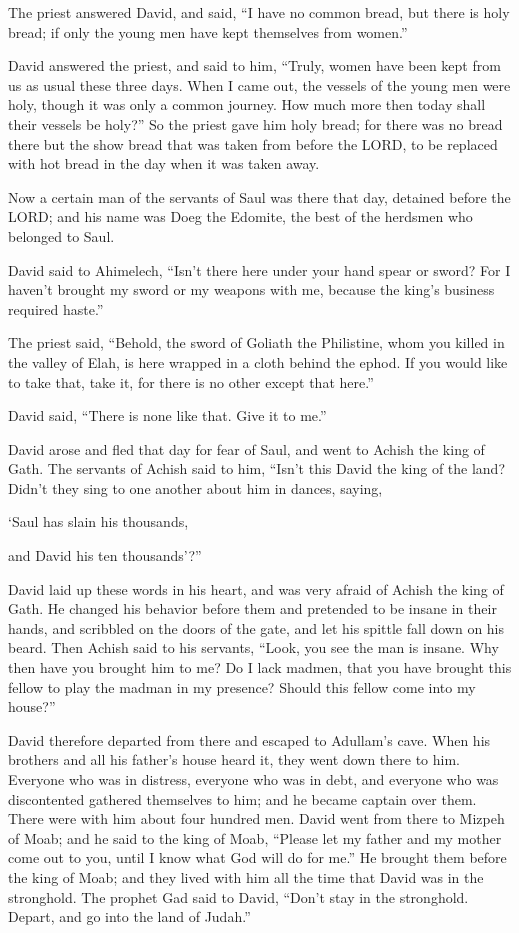 \myverse{}The priest answered David, and said, “I have no common bread,
but there is holy bread; if only the young men have kept themselves from women.”

\myverse{}David answered the priest, and said to him, “Truly, women have
been kept from us as usual these three days. When I came out, the vessels of the young men were holy,
though it was only a common journey. How much more then today shall their vessels be holy?”
\myverse{}So the priest gave him holy bread; for there was no bread there but the show
bread that was taken from before the LORD, to be replaced with hot bread in the day when it was taken
away.

\myverse{}Now a certain man of the servants of Saul was there that day,
detained before the LORD; and his name was Doeg the Edomite, the best of the herdsmen who belonged to
Saul.

\myverse{}David said to Ahimelech, “Isn’t there here under your hand spear
or sword? For I haven’t brought my sword or my weapons with me, because the king’s business required haste.”

\myverse{}The priest said, “Behold, the sword of Goliath the Philistine,
whom you killed in the valley of Elah, is here wrapped in a cloth behind the ephod. If you would like
to take that, take it, for there is no other except that here.”

David said, “There is none like that. Give it to me.”

\myverse{}David arose and fled that day for fear of Saul, and went to
Achish the king of Gath.
\myverse{}The servants of Achish said to him, “Isn’t this David the king of the land?
Didn’t they sing to one another about him in dances, saying,

‘Saul has slain his thousands,

and David his ten thousands’?”

\myverse{}David laid up these words in his heart, and was very afraid
of Achish the king of Gath.
\myverse{}He changed his behavior before them and pretended to be insane in their hands,
and scribbled on the doors of the gate, and let his spittle fall down on his beard.
\myverse{}Then Achish said to his servants, “Look, you see the man is insane. Why then
have you brought him to me?
\myverse{}Do I lack madmen, that you have brought this fellow to play the madman in
my presence? Should this fellow come into my house?”


\mychapter{} \myverse*{}David therefore departed from there and escaped to Adullam’s cave.
When his brothers and all his father’s house heard it, they went down there to him.
\myverse{}Everyone who was in distress, everyone who was in debt, and everyone who was
discontented gathered themselves to him; and he became captain over them. There were with him about four
hundred men.
\myverse{}David went from there to Mizpeh of Moab; and he said to the king of Moab, “Please
let my father and my mother come out to you, until I know what God will do for me.”
\myverse{}He brought them before the king of Moab; and they lived with him all the time
that David was in the stronghold.
\myverse{}The prophet Gad said to David, “Don’t stay in the stronghold. Depart, and go
into the land of Judah.”

